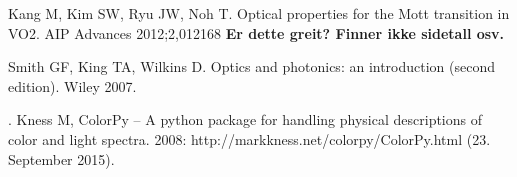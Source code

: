 \begin{thebibliography}{9}

   Kang M, Kim SW, Ryu JW, Noh T.
   Optical properties for the Mott transition in VO2.
   AIP Advances 2012;2,012168 \textbf{Er dette greit? Finner ikke sidetall osv.}

   Smith GF, King TA, Wilkins D.
   Optics and photonics: an introduction (second edition).
   Wiley 2007.

   .
      Kness M,
      ColorPy -- A python package for handling physical descriptions of color and light spectra.
      2008: %
      http://markkness.net/colorpy/ColorPy.html
      (23. September 2015).
\end{thebibliography}



